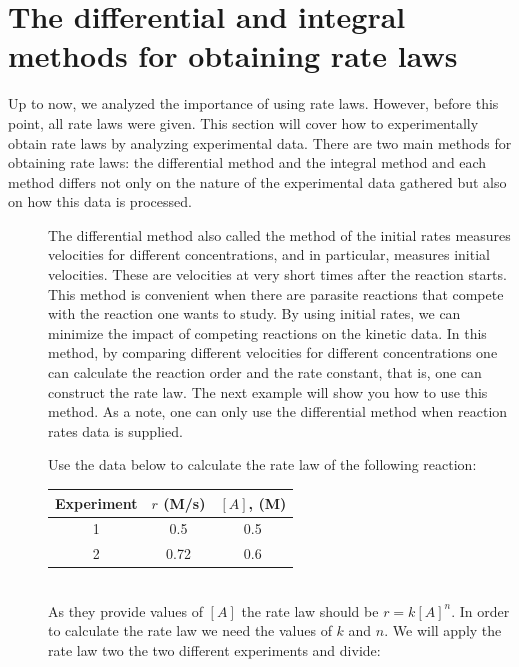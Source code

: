 \documentclass[main.tex]{subfiles}
\begin{document}
\section{The differential and integral methods for obtaining rate laws}
Up to now, we analyzed the importance of using rate laws. However, before this point, all rate laws were given. This section will cover how to experimentally obtain rate laws by analyzing experimental data. There are two main methods for obtaining rate laws: the differential method and the integral method and each method differs not only on the nature of the experimental data gathered but also on how this data is processed. 
\sloppy 
\begin{description}
\item[] 
The differential method also called the method of the initial rates measures velocities for different concentrations, and in particular, measures initial velocities. These are velocities at very short times after the reaction starts. This method is convenient when there are parasite reactions that compete with the reaction one wants to study. By using initial rates, we can minimize the impact of competing reactions on the kinetic data.
In this method, by comparing different velocities for different concentrations one can calculate the reaction order and the rate constant, that is, one can construct the rate law. The next example will show you how to use this method. As a note, one can only use the differential method when reaction rates data is supplied.
\begin{example} %
Use the data below to calculate the rate law of the following reaction: \begin{center}\end{center}
\begin{center}\begin{tabular}[t]{  c c  c   }
\toprule
 Experiment &$r$ (M/s)	&$[A]$, (M) \\
\midrule
1&	0.5&	0.5\\
2&	0.72 &0.6	\\
\bottomrule
\end{tabular}\end{center}
\\
As they provide values of $[A]$ the rate law should be $r=k[A]^n$. In order to calculate the rate law we need the values of $k$ and $n$.
We will apply the rate law two the two different experiments and divide:

\end{example}
\end{description}
\end{document}

